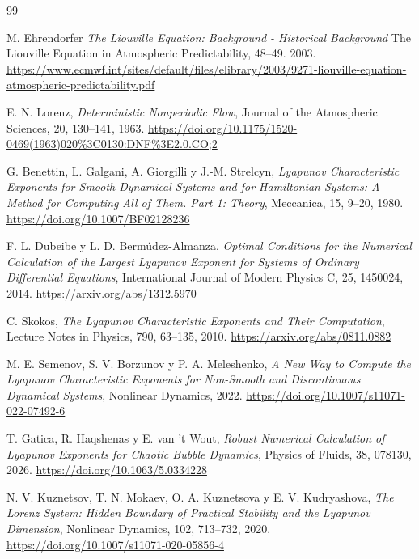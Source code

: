 \documentclass[12pt,a4paper,oneside]{report}
\theoremstyle{definition}
\numberwithin{equation}{chapter}
\begin{document}
\begin{thebibliography}{99}

 M. Ehrendorfer
\emph{The Liouville Equation: Background - Historical Background}
The Liouville Equation in Atmospheric Predictability, 48–49. 2003.
\url{https://www.ecmwf.int/sites/default/files/elibrary/2003/9271-liouville-equation-atmospheric-predictability.pdf}

 E. N. Lorenz, \emph{Deterministic Nonperiodic Flow}, Journal of the Atmospheric Sciences, 20, 130--141, 1963. \url{https://doi.org/10.1175/1520-0469(1963)020%3C0130:DNF%3E2.0.CO;2}

 G. Benettin, L. Galgani, A. Giorgilli y J.-M. Strelcyn, \emph{Lyapunov Characteristic Exponents for Smooth Dynamical Systems and for Hamiltonian Systems: A Method for Computing All of Them. Part 1: Theory}, Meccanica, 15, 9--20, 1980. \url{https://doi.org/10.1007/BF02128236}

 F. L. Dubeibe y L. D. Bermúdez-Almanza, \emph{Optimal Conditions for the Numerical Calculation of the Largest Lyapunov Exponent for Systems of Ordinary Differential Equations}, International Journal of Modern Physics C, 25, 1450024, 2014. \url{https://arxiv.org/abs/1312.5970}

 C. Skokos, \emph{The Lyapunov Characteristic Exponents and Their Computation}, Lecture Notes in Physics, 790, 63--135, 2010. \url{https://arxiv.org/abs/0811.0882}

 M. E. Semenov, S. V. Borzunov y P. A. Meleshenko, \emph{A New Way to Compute the Lyapunov Characteristic Exponents for Non-Smooth and Discontinuous Dynamical Systems}, Nonlinear Dynamics, 2022. \url{https://doi.org/10.1007/s11071-022-07492-6}

 T. Gatica, R. Haqshenas y E. van 't Wout, \emph{Robust Numerical Calculation of Lyapunov Exponents for Chaotic Bubble Dynamics}, Physics of Fluids, 38, 078130, 2026. \url{https://doi.org/10.1063/5.0334228}

 N. V. Kuznetsov, T. N. Mokaev, O. A. Kuznetsova y E. V. Kudryashova, \emph{The Lorenz System: Hidden Boundary of Practical Stability and the Lyapunov Dimension}, Nonlinear Dynamics, 102, 713--732, 2020. \url{https://doi.org/10.1007/s11071-020-05856-4}


\end{thebibliography}
\end{document}

